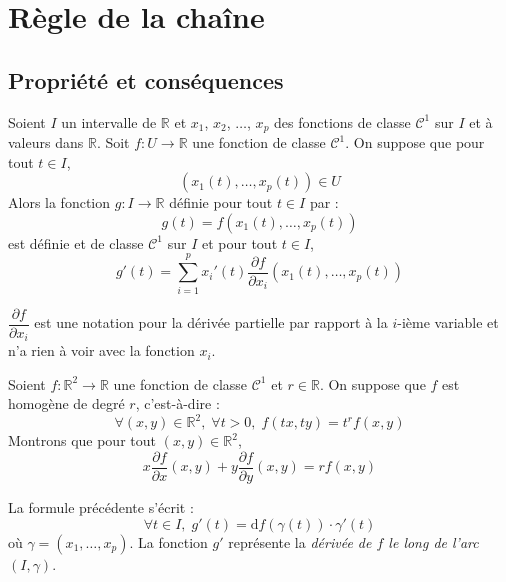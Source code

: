 \documentclass[a4paper,10pt]{report}
\begin{document}
\section{Règle de la chaîne}
\subsection{Propriété et conséquences}
\begin{thm} Soient $I$ un intervalle de $\mathbb{R}$ et $x_1$, $x_2$, $\ldots$, $x_p$ des fonctions de classe $\mathcal{C}^1$ sur $I$ et à valeurs dans $\mathbb{R}$. Soit $f : U \rightarrow \mathbb{R}$ une fonction de classe $\mathcal{C}^1$. On suppose que pour tout $t \in I$,
$$ (x_1(t), \ldots, x_p(t)) \in U$$
Alors la fonction $g : I \rightarrow \mathbb{R}$ définie pour tout $t \in I$ par :
$$ g(t)=f(x_1(t), \ldots, x_p(t))$$
est définie et de classe $\mathcal{C}^1$ sur $I$ et pour tout $t \in I$,
$$ g'(t) = \sum_{i=1}^p x_i'(t) \dfrac{\partial f}{\partial x_i}(x_1(t), \ldots, x_p(t))$$
\end{thm}

\medskip

\begin{att} $\dfrac{\partial f}{\partial x_i}$ est une notation pour la dérivée partielle par rapport à la $i$-ième variable et n'a rien à voir avec la fonction $x_i$.
\end{att}

\medskip

\begin{ex} Soient $f : \mathbb{R}^2 \rightarrow \mathbb{R}$ une fonction de classe $\mathcal{C}^1$ et $r \in \mathbb{R}$. On suppose que $f$ est homogène de degré $r$, c'est-à-dire :
$$ \forall (x,y) \in \mathbb{R}^2, \; \forall t >0, \; f(tx,ty) = t^r f(x,y)$$
Montrons que pour tout $(x,y) \in \mathbb{R}^2$,
$$ x \dfrac{\partial f}{\partial x}(x,y) + y \dfrac{\partial f}{\partial y}(x,y) =r f(x,y)$$

\vspace{5cm}
\end{ex}


\newpage

\begin{rem} La formule précédente s'écrit :
$$ \forall t \in I, \; g'(t) =\textrm{d}f(\gamma(t)) \cdot \gamma'(t)$$
où $\gamma =(x_1, \ldots, x_p)$. La fonction $g'$ représente la \textit{dérivée de $f$ le long de l'arc} $(I, \gamma)$.
\end{rem}

\medskip
\end{document}
